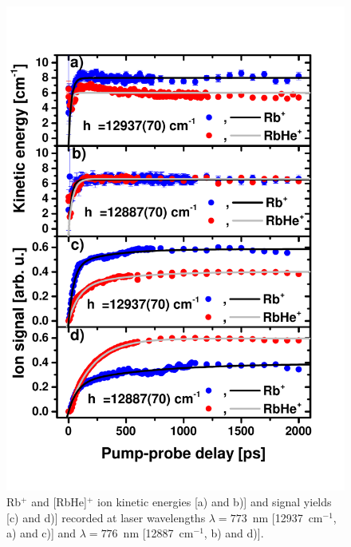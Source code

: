 \begin{figure}[ht]
	\centering
	\includegraphics[width=0.9\linewidth]{fig3}
	\caption{Rb$^+$ and [RbHe]$^+$ ion kinetic energies [a) and b)] and signal yields [c) and d)] recorded at laser wavelengths $\lambda=773$~nm [12937~cm$^{-1}$, a) and c)] and $\lambda=776$~nm [12887~cm$^{-1}$, b) and d)].}
	\label{fig:speeds}
\end{figure}

